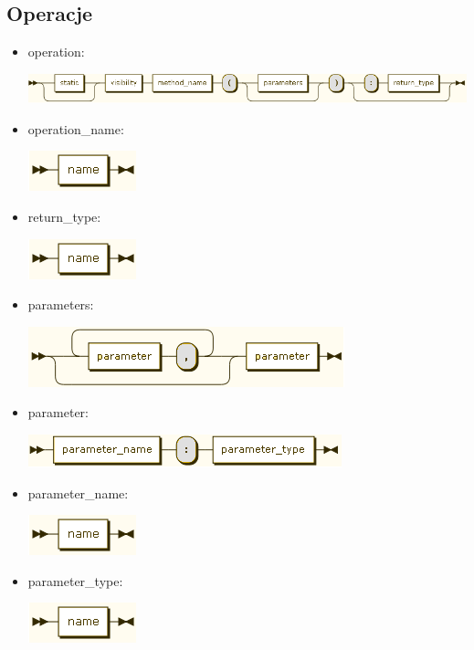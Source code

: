 \subsection{Operacje}
\begin{itemize}
\item operation:

\includegraphics[scale=0.66]{images/grammar/operation.png}

\item operation\_name:

\includegraphics[scale=0.66]{images/grammar/name_xx.png}

\item return\_type:

\includegraphics[scale=0.66]{images/grammar/name_xx.png}

\item parameters:

\includegraphics[scale=0.66]{images/grammar/parameters.png}

\item parameter:

\includegraphics[scale=0.66]{images/grammar/parameter.png}

\item parameter\_name:

\includegraphics[scale=0.66]{images/grammar/name_xx.png}

\item parameter\_type:

\includegraphics[scale=0.66]{images/grammar/name_xx.png}
\end{itemize}
